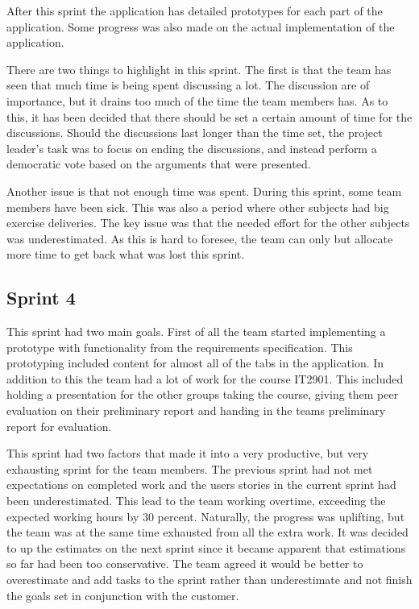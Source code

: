 After this sprint the application has detailed prototypes for each part of the application.  Some progress was also made on the actual implementation of the application.

There are two things to highlight in this sprint. The first is that the team has seen that much time is being spent discussing a lot. The discussion are of importance, but it drains too much of the time the team members has. As to this, it has been decided that there should be set a certain amount of time for the discussions. Should the discussions last longer than the time set, the project leader's task was to focus on ending the discussions, and instead perform a democratic vote based on the arguments that were presented. 

Another issue is that not enough time was spent. During this sprint, some team  members have been sick. This was also a period where other subjects had big exercise deliveries. The key issue was that the needed effort for the other subjects was underestimated. As this is hard to foresee, the team can only but allocate more time to get back what was lost this sprint.

\subsection{Sprint 4}
This sprint had two main goals. First of all the team started implementing a prototype with functionality from the requirements specification. This prototyping included content for almost all of the tabs in the application. In addition to this the team had a lot of work for the course IT2901. This included holding a presentation for the other groups taking the course, giving them peer evaluation on their preliminary report and handing in the teams preliminary report for evaluation.

This sprint had two factors that made it into a very productive, but very exhausting sprint for the team members. The previous sprint had not met expectations on completed work and the users stories in the current sprint had been underestimated. This lead to the team working overtime, exceeding the expected working hours by 30 percent. Naturally, the progress was uplifting, but the team was at the same time exhausted from all the extra work. It was decided to up the estimates on the next sprint since it became apparent that estimations so far had been too conservative. The team agreed it would be better to overestimate and add tasks to the sprint rather than underestimate and not finish the goals set in conjunction with the customer.

